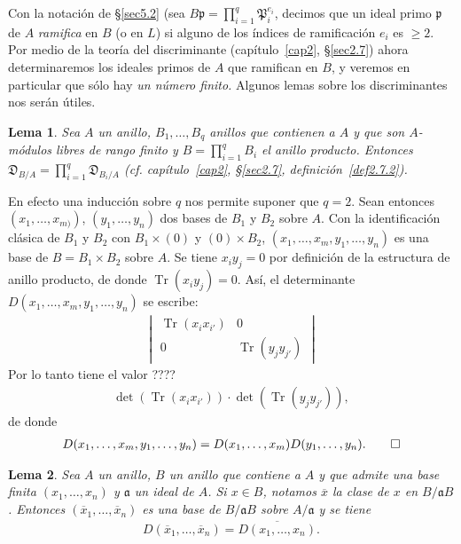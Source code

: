 \documentclass[bibtotoc,leqno,spanish]{amsbook}
\newcommand{\idl}[1]{\mathfrak{#1}}
\newcommand{\QED}{LQQD.}
\newcommand{\oline}[1]{\overline{#1}}
\newcommand{\disc}{\mathfrak{D}}
\DeclareMathOperator{\Tr}{Tr}
\numberwithin{equation}{section}
\theoremstyle{note}
\theoremstyle{note}
\newtheorem{lemma}{Lema}
\theoremstyle{rem}
\numberwithin{theorem}{section}
\numberwithin{proposition}{section}
\numberwithin{definition}{section}
\numberwithin{lemma}{section}
\numberwithin{corollary}{section}
\numberwithin{example}{section}
\numberwithin{footnote}{section}%
\begin{document}
Con la notaci\'on de \S\ref{sec5.2} (sea $B\idl{p}=\prod_{i=1}^{q}\idl{P}_{i}^{e_{i}}$, decimos que un ideal primo
$\idl{p}$ de $A$ {\em ramifica} en $B$ (o en $L$) si alguno de los \'indices de ramificaci\'on $e_{i}$ es
$\geq 2$. Por medio de la teor\'ia del discriminante (cap\'itulo~\ref{cap2}, \S\ref{sec2.7}) ahora determinaremos los
ideales primos de $A$ que ramifican en $B$, y veremos en particular que s\'olo hay {\em un n\'umero finito.}
Algunos lemas sobre los discriminantes nos ser\'an \'utiles.

\begin{lemma}\label{lem5.3.1}
Sea $A$ un anillo, $B_{1},\dots, B_{q}$ anillos que contienen a $A$ y que son $A$-m\'odulos libres de rango finito
y $B = \prod_{i=1}^{q}B_{i}$ el anillo producto. Entonces $\disc_{B/A}=\prod_{i=1}^{q}\disc_{B_{i}/A}$
(cf. cap\'itulo~\ref{cap2}, \S\ref{sec2.7}, definici\'on~\ref{def2.7.2}).
\end{lemma}

En efecto una inducci\'on sobre $q$ nos permite suponer que $q=2$. Sean entonces $(x_{1},\dots,x_{m)})$,
$(y_{1},\dots,y_{n})$ dos bases de $B_{1}$ y $B_{2}$ sobre $A$. Con la identificaci\'on cl\'asica de $B_{1}$ y
$B_{2}$ con $B_{1}\times(0)$ y $(0)\times B_{2}$, $(x_{1},\dots,x_{m},y_{1},\dots,y_{n})$ es una base de
$B = B_{1}\times B_{2}$ sobre $A$. Se tiene $x_{i}y_{j}=0$ por definici\'on de la estructura de anillo producto,
de donde $\Tr(x_{i}y_{j}) = 0$. As\'i, el determinante $D(x_{1},\dots,x_{m},y_{1},\dots,y_{n})$ se escribe:
\begin{gather*}
\begin{vmatrix}
\Tr(x_{i}x_{i'}) & 0\\
0 & \Tr(y_{j}y_{j'})
\end{vmatrix}
\end{gather*}
Por lo tanto tiene el valor ????
\begin{gather*}
\det(\Tr(x_{i}x_{i'}))\cdot\det(\Tr(y_{j}y_{j'})),
\end{gather*}
de donde
\begin{gather*}
D(x_{1},\dots,x_{m},y_{1},\dots,y_{n}) = D(x_{1},\dots,x_{m})D(y_{1},\dots,y_{n}).\qedhere%
\end{gather*}

\begin{lemma}\label{lem5.3.2}
Sea $A$ un anillo, $B$ un anillo que contiene a $A$ y que admite una base finita $(x_{1},\dots,x_{n})$ y
$\idl{a}$ un ideal de $A$. Si $x\in B$, notamos $\oline x$ la clase de $x$ en $B/\idl{a}B$. Entonces
$(\oline x_{1},\dots,\oline x_{n})$ es una base de $B/\idl{a}B$ sobre $A/\idl{a}$ y se tiene
\begin{gather}\label{eq-5.3-1}
D(\oline x_{1},\dots,\oline x_{n}) = \oline{D(x_{1},\dots,x_{n})}.
\end{gather}
\end{lemma}
\end{document}

